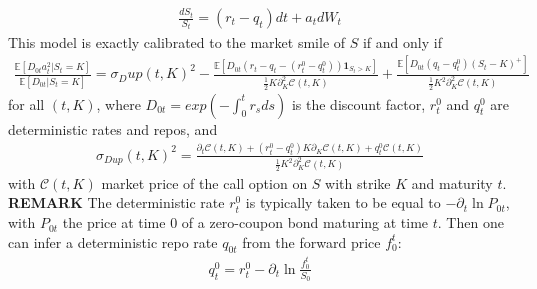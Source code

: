 \documentclass[a4paper, 12pt]{article}
\numberwithin{equation}{subsection}
\begin{document}
\begin{align}
\frac{dS_t}{S_t}=(r_t - q_t)dt + a_tdW_t
\end{align}
This model is exactly calibrated to the market smile of $S$ if and only if
\begin{align}
\frac{\mathbb{E}[D_{0t}a_t^2|S_t = K]}{\mathbb{E}[D_{0t}|S_t = K]} = \sigma_Dup(t,K)^2 - \frac{\mathbb{E}[D_{0t}(r_t-q_t-(r_t^0 - q_t^0))\mathbf{1}_{S_t>K}]}{\frac{1}{2}K\partial_K^2 \mathcal{C}(t,K)} + \frac{\mathbb{E}[D_{0t}(q_t - q_t^0)(S_t - K)^+]}{\frac{1}{2}K^2\partial_K^2 \mathcal{C}(t,K)}
\end{align}
for all $(t,K)$, where $D_{0t} = exp\left(-\int_0^t r_sds\right)$ is the discount factor, $r_t^0$ and $q_t^0$ are deterministic rates and repos, and
\begin{align}
\sigma_{Dup}(t,K)^2 = \frac{\partial_t\mathcal{C}(t,K)+(r_t^0 - q_t^0)K\partial_K\mathcal{C}(t,K) + q_t^0\mathcal{C}(t,K)}{\frac{1}{2}K^2\partial_K^2 \mathcal{C}(t,K)}
\end{align}
with $\mathcal{C}(t,K)$ market price of the call option on $S$ with strike $K$ and maturity $t$.
\\
\textbf{REMARK} The deterministic rate $r_t^0$ is typically taken to be equal to $-\partial_t\ln P_{0t}$, with $P_{0t}$ the price at time 0 of a zero-coupon bond maturing at time $t$. Then one can infer a deterministic repo rate $q_{0t}$ from the forward price $f_0^t$:
\begin{align}
q_t^0 = r_t^0 - \partial_t\ln\frac{f_0^t}{S_0}
\end{align}
\end{document}
